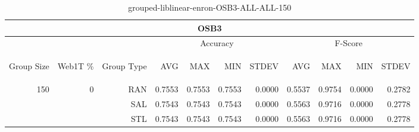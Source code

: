 \begin{center}
\begin{table}[htbp]
\begin{tabular}{ | r | r | r | r | r | r | r | r | r | r | r |}
\hline
\multicolumn{11}{|c|}{OSB3}\\
\hline
 & & & \multicolumn{4}{|c|}{Accuracy} & \multicolumn{4}{|c|}{F-Score}\\ \cline{4-11}
\begin{sideways}Group Size\end{sideways} & \begin{sideways}Web1T \%\end{sideways} & \begin{sideways}Group Type\end{sideways} & \begin{sideways}AVG\end{sideways} & \begin{sideways}MAX\end{sideways} & \begin{sideways}MIN\end{sideways} & \begin{sideways}STDEV\end{sideways} & \begin{sideways}AVG\end{sideways} & \begin{sideways}MAX\end{sideways} & \begin{sideways}MIN\end{sideways} & \begin{sideways}STDEV\end{sideways}\\
\hline
\multirow{3}{*}{150}
 & \multirow{3}{*}{0} & RAN & 0.7553 & 0.7553 & 0.7553 & 0.0000 & 0.5537 & 0.9754 & 0.0000 & 0.2782\\ \cline{3-11}
 &   & SAL & 0.7543 & 0.7543 & 0.7543 & 0.0000 & 0.5563 & 0.9716 & 0.0000 & 0.2778\\ \cline{3-11}
 &   & STL & 0.7543 & 0.7543 & 0.7543 & 0.0000 & 0.5563 & 0.9716 & 0.0000 & 0.2778\\ \cline{2-11}
\hline
\end{tabular}
\caption{grouped-liblinear-enron-OSB3-ALL-ALL-150}
\end{table}
\end{center}

